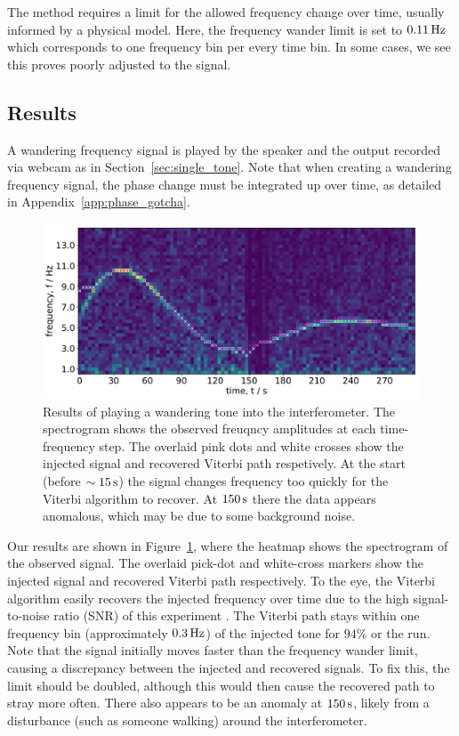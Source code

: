 \documentclass[paper-main.tex]{subfiles}
\begin{document}
The method requires a limit for the allowed frequency change over time, usually informed by a physical model. 
Here, the frequency wander limit is set to $0.11\,{\rm Hz}$ which corresponds to one frequency bin per every time bin. 
In some cases, we see this proves poorly adjusted to the signal. 

\subsection{Results}

A wandering frequency signal is played by the speaker and the output recorded via webcam as in Section~\ref{sec:single_tone}.
Note that when creating a wandering frequency signal, the phase change must be integrated up over time, as detailed in Appendix~\ref{app:phase_gotcha}.

\begin{figure}
	\includegraphics[width=\textwidth]{figures/expt_overlay_2_viterbi_test_webcam.pdf}
	\caption{Results of playing a wandering tone into the interferometer. The spectrogram shows the observed freuqncy amplitudes at each time-frequency step. The overlaid pink dots and white crosses show the injected signal and recovered Viterbi path respetively. At the start (before $\sim 15\,{\rm s}$) the signal changes frequency too quickly for the Viterbi algorithm to recover. At $150\,{\rm s}$ there the data appears anomalous, which may be due to some background noise. }
	\label{fig:viterbi_overlay}
\end{figure}

Our results are shown in Figure~\ref{fig:viterbi_overlay}, where the heatmap shows the spectrogram of the observed signal. 
The overlaid pick-dot and white-cross markers show the injected signal and recovered Viterbi path respectively. 
To the eye, the Viterbi algorithm easily recovers the injected frequency over time due to the high signal-to-noise ratio (SNR) of this experiment .
The Viterbi path stays within one frequency bin (approximately $0.3\,{\rm Hz}$) of the injected tone for $94\%$ or the run. 
Note that the signal initially moves faster than the frequency wander limit, causing a discrepancy between the injected and recovered signals. 
To fix this, the limit should be doubled, although this would then cause the recovered path to stray more often. 
There also appears to be an anomaly at $150\,{\rm s}$, likely from a disturbance (such as someone walking) around the interferometer.
\end{document}

